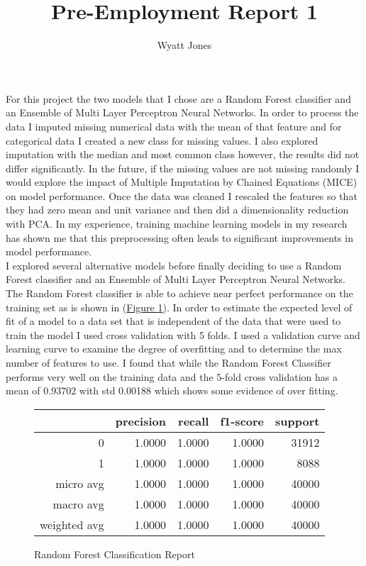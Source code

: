 \documentclass[12pt]{article}
\title{Pre-Employment Report 1}
\author{Wyatt Jones}
\begin{document}
\maketitle{}

For this project the two models that I chose are a Random Forest classifier and an Ensemble of Multi Layer Perceptron Neural Networks. In order to process the data I imputed missing numerical data with the mean of that feature and for categorical data I created a new class for missing values. I also explored imputation with the median and most common class however, the results did not differ significantly. In the future, if the missing values are not missing randomly I would explore the impact of Multiple Imputation by Chained Equations (MICE) on model performance. Once the data was cleaned I rescaled the features so that they had zero mean and unit variance and then did a dimensionality reduction with PCA. In my experience, training machine learning models in my research has shown me that this preprocessing often leads to significant improvements in model performance.\\
I explored several alternative models before finally deciding to use a Random Forest classifier and an Ensemble of Multi Layer Perceptron Neural Networks. The Random Forest classifier is able to achieve near perfect performance on the training set as is shown in (\hyperref[RandomForest_ClassificationReport]{Figure \ref{RandomForest_ClassificationReport}}). In order to estimate the expected level of fit of a model to a data set that is independent of the data that were used to train the model I used cross validation with 5 folds. I used a validation curve and learning curve to examine the degree of overfitting and to determine the max number of features to use. I found that while the Random Forest Classifier performs very well on the training data and the 5-fold cross validation has a mean of 0.93702 with std 0.00188 which shows some evidence of over fitting.

\begin{figure}[H]
  \centering
  \begin{tabular}{r|r|r|r|r}
  & precision  & recall & f1-score & support \\
  \hline
  0             &1.0000 &1.0000 &1.0000     &31912\\
  1             &1.0000 &1.0000 &1.0000      &8088\\
  micro avg     &1.0000 &1.0000 &1.0000     &40000\\
  macro avg     &1.0000 &1.0000 &1.0000     &40000\\
  weighted avg  &1.0000 &1.0000 &1.0000     &40000\\
  \end{tabular}
  \caption{Random Forest Classification Report}
  \label{RandomForest_ClassificationReport}
\end{figure}
\end{document}
